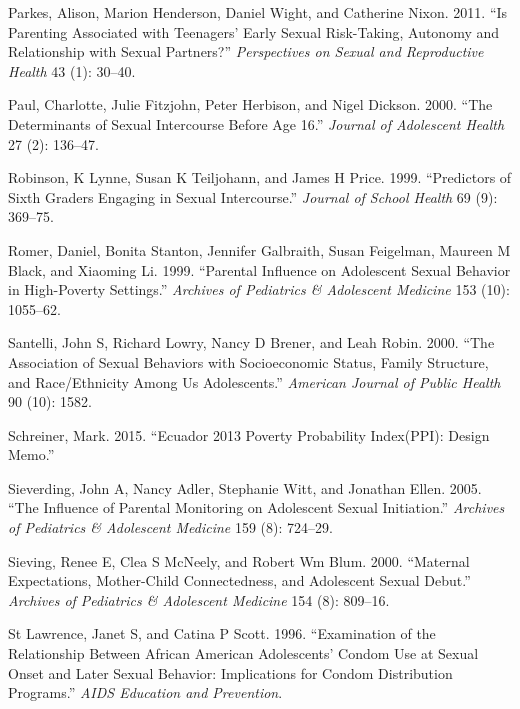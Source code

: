 \documentclass[
]{article}
\newlength{\cslhangindent}
\newenvironment{cslreferences}%
  {\setlength{\parindent}{0pt}%
  \everypar{\setlength{\hangindent}{\cslhangindent}}\ignorespaces}%
  {\par}
\begin{document}
\begin{cslreferences}
\leavevmode\hypertarget{ref-parkes2011parenting}{}%
Parkes, Alison, Marion Henderson, Daniel Wight, and Catherine Nixon.
2011. ``Is Parenting Associated with Teenagers' Early Sexual
Risk-Taking, Autonomy and Relationship with Sexual Partners?''
\emph{Perspectives on Sexual and Reproductive Health} 43 (1): 30--40.

\leavevmode\hypertarget{ref-paul2000determinants}{}%
Paul, Charlotte, Julie Fitzjohn, Peter Herbison, and Nigel Dickson.
2000. ``The Determinants of Sexual Intercourse Before Age 16.''
\emph{Journal of Adolescent Health} 27 (2): 136--47.

\leavevmode\hypertarget{ref-robinson1999predictors}{}%
Robinson, K Lynne, Susan K Teiljohann, and James H Price. 1999.
``Predictors of Sixth Graders Engaging in Sexual Intercourse.''
\emph{Journal of School Health} 69 (9): 369--75.

\leavevmode\hypertarget{ref-romer1999parental}{}%
Romer, Daniel, Bonita Stanton, Jennifer Galbraith, Susan Feigelman,
Maureen M Black, and Xiaoming Li. 1999. ``Parental Influence on
Adolescent Sexual Behavior in High-Poverty Settings.'' \emph{Archives of
Pediatrics \& Adolescent Medicine} 153 (10): 1055--62.

\leavevmode\hypertarget{ref-santelli2000association}{}%
Santelli, John S, Richard Lowry, Nancy D Brener, and Leah Robin. 2000.
``The Association of Sexual Behaviors with Socioeconomic Status, Family
Structure, and Race/Ethnicity Among Us Adolescents.'' \emph{American
Journal of Public Health} 90 (10): 1582.

\leavevmode\hypertarget{ref-schreiner2015ecuador}{}%
Schreiner, Mark. 2015. ``Ecuador 2013 Poverty Probability Index(PPI):
Design Memo.''

\leavevmode\hypertarget{ref-sieverding2005influence}{}%
Sieverding, John A, Nancy Adler, Stephanie Witt, and Jonathan Ellen.
2005. ``The Influence of Parental Monitoring on Adolescent Sexual
Initiation.'' \emph{Archives of Pediatrics \& Adolescent Medicine} 159
(8): 724--29.

\leavevmode\hypertarget{ref-sieving2000maternal}{}%
Sieving, Renee E, Clea S McNeely, and Robert Wm Blum. 2000. ``Maternal
Expectations, Mother-Child Connectedness, and Adolescent Sexual Debut.''
\emph{Archives of Pediatrics \& Adolescent Medicine} 154 (8): 809--16.

\leavevmode\hypertarget{ref-st1996examination}{}%
St Lawrence, Janet S, and Catina P Scott. 1996. ``Examination of the
Relationship Between African American Adolescents' Condom Use at Sexual
Onset and Later Sexual Behavior: Implications for Condom Distribution
Programs.'' \emph{AIDS Education and Prevention}.


\end{cslreferences}
\end{document}

